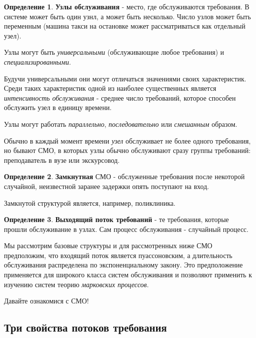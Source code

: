 \documentclass[aps,%
12pt,%
final,%
oneside,
onecolumn,%
musixtex, %
superscriptaddress,%
centertags]{article} %
\theoremstyle{plain}
\theoremstyle{definition}
\newtheorem{definition}{Определение}[subsection]
\theoremstyle{remark}
\begin{document}
\begin{definition}
	\textbf{Узлы обслуживания} - место, где обслуживаются требования. В системе может быть один узнл, а может быть несколько. Число узлов может быть переменным (машина такси на остановке может рассматриваться как отдельный узел).

	Узлы могут быть \textit{универсальными} (обслуживающие любое требования) и \textit{специализированными}.

	Будучи универсальными они могут отличаться значениями своих характеристик. Среди таких характеристик одной из наиболее существенных является \textit{интенсивность обслуживания} - среднее число требований, которое способен обслужить узел в единицу времени.

	Узлы могут работать \textit{параллельно}, \textit{последовательно} или \textit{смешанным} образом.
\end{definition}

Обычно в каждый момент времени \textit{узел} обслуживает не более одного требования, но бывают \textsc{СМО}, в которых узлы обычно обслуживают сразу группы требований: преподаватель в вузе или экскурсовод.

\begin{definition}
	\textbf{Замкнутная} \textsc{СМО} - обслуженные требования после некоторой случайной, неизвестной заранее задержки опять поступают на вход.

	Замкнутой структурой является, например, поликлиника.
\end{definition}

\begin{definition}
	\textbf{Выходящий поток требований} - те требования, которые прошли обслуживание в узлах. Сам процесс обслуживания - случайный процесс.
\end{definition}

Мы рассмотрим базовые структуры и для рассмотренных ниже СМО предположим, что входящий поток является пуассоновским, а длительность обслуживания распределена по экспоненциальному закону. Это предположение применяется для широкого класса систем обслуживания и позволяют применить к изучению систем теорию \textit{марковских процессов}.

Давайте ознакомися с СМО!

\newpage
\subsection{Три свойства потоков требования}
\end{document}
